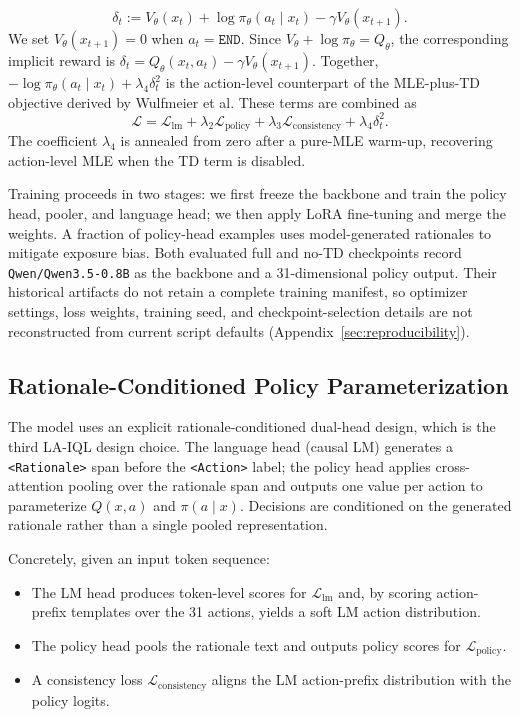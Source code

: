 \documentclass[manuscript,review,anonymous]{acmart}
\begin{document}
\begin{equation}
\delta_t:=V_\theta(x_t)+\log \pi_\theta(a_t\mid x_t)-\gamma V_\theta(x_{t+1}).
\end{equation}
We set $V_\theta(x_{t+1})=0$ when $a_t=\texttt{END}$. Since $V_\theta+\log\pi_\theta=Q_\theta$, the corresponding implicit reward is $\delta_t=Q_\theta(x_t,a_t)-\gamma V_\theta(x_{t+1})$. Together, $-\log\pi_\theta(a_t\mid x_t)+\lambda_4\delta_t^2$ is the action-level counterpart of the MLE-plus-TD objective derived by Wulfmeier et al.
These terms are combined as
\begin{equation}
\mathcal{L}
=
\mathcal{L}_{\mathrm{lm}}
+
\lambda_2\mathcal{L}_{\mathrm{policy}}
+
\lambda_3\mathcal{L}_{\mathrm{consistency}}
+
\lambda_4\delta_t^2.
\label{eq:total-loss}
\end{equation}
The coefficient $\lambda_4$ is annealed from zero after a pure-MLE warm-up, recovering action-level MLE when the TD term is disabled.

Training proceeds in two stages: we first freeze the backbone and train the policy head, pooler, and language head; we then apply LoRA fine-tuning and merge the weights. A fraction of policy-head examples uses model-generated rationales to mitigate exposure bias.
Both evaluated full and no-TD checkpoints record \texttt{Qwen/Qwen3.5-0.8B}
as the backbone and a 31-dimensional policy output. Their historical artifacts
do not retain a complete training manifest, so optimizer settings, loss
weights, training seed, and checkpoint-selection details are not reconstructed
from current script defaults (Appendix~\ref{sec:reproducibility}).

\subsection{Rationale-Conditioned Policy Parameterization}

The model uses an explicit rationale-conditioned dual-head design, which is the third LA-IQL design choice.
The language head (causal LM) generates a \texttt{<Rationale>} span before the \texttt{<Action>} label; the policy head applies cross-attention pooling over the rationale span and outputs one value per action to parameterize $Q(x,a)$ and $\pi(a\mid x)$.
Decisions are conditioned on the generated rationale rather than a single pooled representation.

Concretely, given an input token sequence:
\begin{itemize}[leftmargin=*,itemsep=2pt]
    \item The LM head produces token-level scores for $\mathcal{L}_{\mathrm{lm}}$ and, by scoring action-prefix templates over the 31 actions, yields a soft LM action distribution.
    \item The policy head pools the rationale text and outputs policy scores for $\mathcal{L}_{\mathrm{policy}}$.
    \item A consistency loss $\mathcal{L}_{\mathrm{consistency}}$ aligns the LM action-prefix distribution with the policy logits.
\end{itemize}
\end{document}
